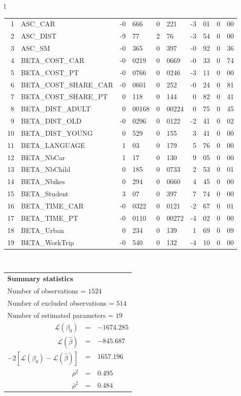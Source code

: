 \begin{tabular}{l}
\begin{tabular}{rlr@{.}lr@{.}lr@{.}lr@{.}l}
1 & ASC_CAR & -0&666 & 0&221 & -3&01 & 0&00\\
2 & ASC_DIST & -9&77 & 2&76 & -3&54 & 0&00\\
3 & ASC_SM & -0&365 & 0&397 & -0&92 & 0&36\\
4 & BETA_COST_CAR & -0&0219 & 0&0669 & -0&33 & 0&74\\
5 & BETA_COST_PT & -0&0766 & 0&0246 & -3&11 & 0&00\\
6 & BETA_COST_SHARE_CAR & -0&0601 & 0&252 & -0&24 & 0&81\\
7 & BETA_COST_SHARE_PT & 0&118 & 0&144 & 0&82 & 0&41\\
8 & BETA_DIST_ADULT & 0&00168 & 0&00224 & 0&75 & 0&45\\
9 & BETA_DIST_OLD & -0&0296 & 0&0122 & -2&41 & 0&02\\
10 & BETA_DIST_YOUNG & 0&529 & 0&155 & 3&41 & 0&00\\
11 & BETA_LANGUAGE & 1&03 & 0&179 & 5&76 & 0&00\\
12 & BETA_NbCar & 1&17 & 0&130 & 9&05 & 0&00\\
13 & BETA_NbChild & 0&185 & 0&0733 & 2&53 & 0&01\\
14 & BETA_Nbikes & 0&294 & 0&0660 & 4&45 & 0&00\\
15 & BETA_Student & 3&07 & 0&397 & 7&74 & 0&00\\
16 & BETA_TIME_CAR & -0&0322 & 0&0121 & -2&67 & 0&01\\
17 & BETA_TIME_PT & -0&0110 & 0&00272 & -4&02 & 0&00\\
18 & BETA_Urban & 0&234 & 0&139 & 1&69 & 0&09\\
19 & BETA_WorkTrip & -0&540 & 0&132 & -4&10 & 0&00\\
\hline
\end{tabular}
\\
\begin{tabular}{rcl}
\multicolumn{3}{l}{\bf Summary statistics}\\
\multicolumn{3}{l}{ Number of observations = $1524$} \\
\multicolumn{3}{l}{ Number of excluded observations = $514$} \\
\multicolumn{3}{l}{ Number of estimated  parameters = $19$} \\
 $\mathcal{L}(\beta_0)$ &=&  $-1674.285$ \\
 $\mathcal{L}(\hat{\beta})$ &=& $-845.687 $  \\
 $-2[\mathcal{L}(\beta_0) -\mathcal{L}(\hat{\beta})]$ &=& $1657.196$ \\
    $\rho^2$ &=&   $0.495$ \\
    $\bar{\rho}^2$ &=&    $0.484$ \\
\end{tabular}
  \end{tabular}
